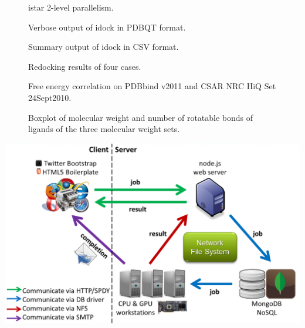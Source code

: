 \documentclass[12pt]{article}
\begin{document}
\begin{figure}
\caption{\label{2LevelParallelism} istar 2-level parallelism.}
\end{figure}

\begin{figure}
\caption{\label{OutputPDBQT} Verbose output of idock in PDBQT format.}
\end{figure}

\begin{figure}
\caption{\label{OutputCSV} Summary output of idock in CSV format.}
\end{figure}

\begin{figure}
\caption{\label{Redocking} Redocking results of four cases.}
\end{figure}

\begin{figure}
\caption{\label{FECorrelation} Free energy correlation on PDBbind v2011 and CSAR NRC HiQ Set 24Sept2010.}
\end{figure}

\begin{figure}
\caption{\label{MWT-NRB} Boxplot of molecular weight and number of rotatable bonds of ligands of the three molecular weight sets.}
\end{figure}





\clearpage

\begin{center}
\includegraphics[width=\linewidth,keepaspectratio=true]{Architecture.png}
\end{center}
\end{document}

